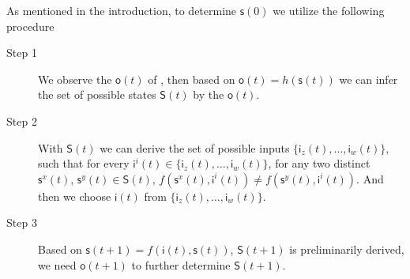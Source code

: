 


As mentioned in the introduction, to determine $\mathsf{s}(0)$ %
we utilize the following procedure
\begin{description}
\item[Step 1] We observe the $\mathsf{o}(t)$ of \BCN, then based on $\mathsf{o}(t)=h(\mathsf{s}(t))$ we can infer the set of possible states $\mathsf{S}(t)$ by the $\mathsf{o}(t)$.
\item[Step 2] With $\mathsf{S}(t)$ we can derive the set of possible inputs $\{\mathsf{i}_z(t),\ldots,\mathsf{i}_w(t)\}$, such that for every $\mathsf{i}^{i}(t)\in \{\mathsf{i}_z(t),\ldots,\mathsf{i}_w(t)\}$, for any two distinct $\mathsf{s}^{x}(t)$, $\mathsf{s}^{y}(t) \in \mathsf{S}(t)$, $f(\mathsf{s}^{x}(t), \mathsf{i}^{i}(t))\neq f(\mathsf{s}^{y}(t),\mathsf{i}^{i}(t))$. And then we choose $\mathsf{i}(t)$ from $\{\mathsf{i}_z(t),\ldots,\mathsf{i}_w(t)\}$.
\item[Step 3] Based on $\mathsf{s}(t+1)= f({\mathsf{i}(t)},{\mathsf{s}(t)})$, $\mathsf{S}(t+1)$ is preliminarily derived, we need $\mathsf{o}(t+1)$ to further determine $\mathsf{S}(t+1)$. 
\end{description}

